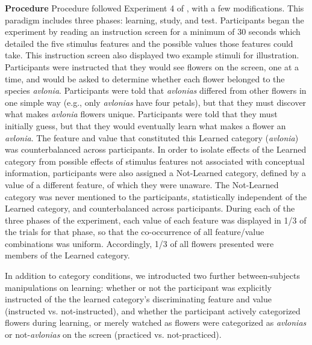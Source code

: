 \documentclass[twocolumn]{svjour3}          %
\begin{document}
\noindent\textbf{Procedure }
Procedure followed Experiment 4 of \citet{DeBrigard2017}, with a few
modifications. This paradigm includes three phases: learning, study,
and test. Participants began the experiment by reading an instruction
screen for a minimum of 30 seconds which detailed the five stimulus
features and the possible values those features could take. This
instruction screen also displayed two example stimuli for
illustration. Participants were instructed that they would see flowers
on the screen, one at a time, and would be asked to determine whether
each flower belonged to the species \emph{avlonia}.  Participants were
told that \emph{avlonias} differed from other flowers in one simple
way (e.g., only \emph{avlonias} have four petals), but that they must
discover what makes \emph{avlonia} flowers unique. Participants were
told that they must initially guess, but that they would eventually
learn what makes a flower an \emph{avlonia}. The feature and value
that constituted this Learned category (\emph{avlonia}) was
counterbalanced across participants. In order to isolate effects of
the Learned category from possible effects of stimulus features not
associated with conceptual information, participants were also
assigned a Not-Learned category, defined by a value of a different
feature, of which they were unaware. The Not-Learned category was
never mentioned to the participants, statistically independent of the
Learned category, and counterbalanced across participants. During each
of the three phases of the experiment, each value of each feature was
displayed in 1/3 of the trials for that phase, so that the
co-occurrence of all feature/value combinations was
uniform. Accordingly, 1/3 of all flowers presented were members of the
Learned category.

In addition to category conditions, we introducted two further
between-subjects manipulations on learning: whether or not the
participant was explicitly instructed of the the learned category's
discriminating feature and value (instructed vs. not-instructed), and
whether the participant actively categorized flowers during learning,
or merely watched as flowers were categorized as \emph{avlonias} or
not-\emph{avlonias} on the screen (practiced vs. not-practiced).
\end{document}
